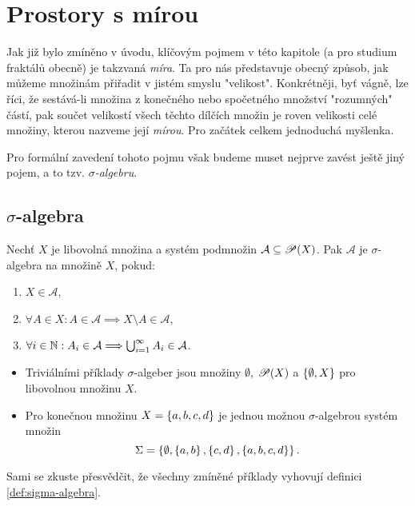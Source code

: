 \section{Prostory s mírou}\label{sec:prostory-s-mirou}

Jak již bylo zmíněno v úvodu, klíčovým pojmem v této kapitole (a pro studium fraktálů obecně) je takzvaná \emph{míra}. Ta pro nás představuje obecný způsob, jak můžeme množinám přiřadit v jistém smyslu "velikost". Konkrétněji, byť vágně, lze říci, že sestává-li množina z konečného nebo spočetného množství "rozumných" částí, pak součet velikostí všech těchto dílčích množin je roven velikosti celé množiny, kterou nazveme její \emph{mírou}. Pro začátek celkem jednoduchá myšlenka.

Pro formální zavedení tohoto pojmu však budeme muset nejprve zavést ještě jiný pojem, a to tzv. \emph{$\sigma$-algebru}.

\subsection{$\sigma$-algebra}\label{subsec:sigma-algebra}

\begin{definition}\label{def:sigma-algebra}
    Nechť $X$ je libovolná množina a systém podmnožin $\mathcal{A}\subseteq\mathscr{P}(X)$. Pak $\mathcal{A}$ je $\sigma$-algebra na množině $X$, pokud:
    \begin{enumerate}[label=(\roman*)]
        \item\label{def:sigma-algebra-podm1} $X\in\mathcal{A}$,
        \item\label{def:sigma-algebra-podm2} $\forall A\in X: A\in\mathcal{A}\implies X\setminus A\in\mathcal{A}$,
        \item\label{def:sigma-algebra-podm3} $\forall i\in\mathbb{N}: A_i\in\mathcal{A}\Longrightarrow\bigcup_{i=1}^\infty A_i\in\mathcal{A}$.
    \end{enumerate}
\end{definition}

\begin{example}
    \begin{itemize}
        \item Triviálními příklady $\sigma$-algeber jsou množiny $\emptyset$, $\mathscr{P}(X)$ a $\left\{\emptyset,X\right\}$ pro libovolnou množinu $X$.
        \item Pro konečnou množinu $X=\left\{a,b,c,d\right\}$ je jednou možnou $\sigma$-algebrou systém množin
        \[\Sigma=\left\{\emptyset,\left\{a,b\right\},\left\{c,d\right\},\left\{a,b,c,d\right\}\right\}.\]
    \end{itemize}
    Sami se zkuste přesvědčit, že všechny zmíněné příklady vyhovují definici \ref{def:sigma-algebra}.
\end{example}

